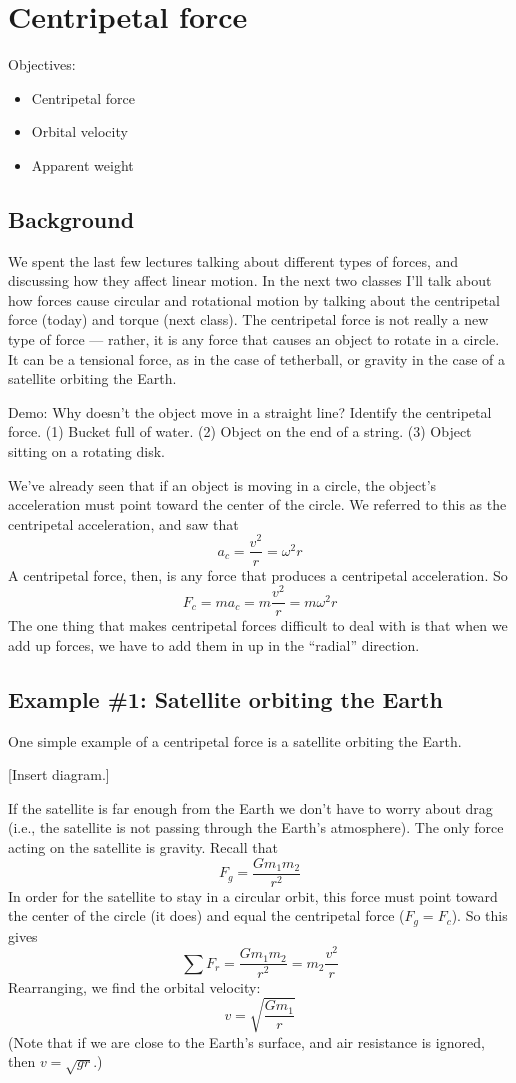 \section{Centripetal force}
Objectives:
\begin{itemize}
\item Centripetal force
\item Orbital velocity
\item Apparent weight
\end{itemize}

\subsection{Background}
We spent the last few lectures talking about different types of forces, and discussing how they affect linear motion. In the next two classes I'll talk about how forces cause circular and rotational motion by talking about the centripetal force (today) and torque (next class). The centripetal force is not really a new type of force --- rather, it is any force that causes an object to rotate in a circle. It can be a tensional force, as in the case of tetherball, or gravity in the case of a satellite orbiting the Earth.

Demo: Why doesn't the object move in a straight line? Identify the centripetal force. (1) Bucket full of water. (2) Object on the end of a string. (3) Object sitting on a rotating disk.

We've already seen that if an object is moving in a circle, the object's acceleration must point toward the center of the circle. We referred to this as the centripetal acceleration, and saw that
$$a_c=\frac{v^2}{r}=\omega^2r$$
A centripetal force, then, is any force that produces a centripetal acceleration. So
$$F_c=ma_c=m\frac{v^2}{r}=m\omega^2r$$
The one thing that makes centripetal forces difficult to deal with is that when we add up forces, we have to add them in up in the ``radial'' direction.

\subsection{Example \#1: Satellite orbiting the Earth}
One simple example of a centripetal force is a satellite orbiting the Earth.

[Insert diagram.]
\vspace{5cm}

If the satellite is far enough from the Earth we don't have to worry about drag (i.e., the satellite is not passing through the Earth's atmosphere). The only force acting on the satellite is gravity. Recall that
$$F_g=\frac{Gm_1m_2}{r^2}$$
In order for the satellite to stay in a circular orbit, this force must point toward the center of the circle (it does) and equal the centripetal force ($F_g=F_c$). So this gives
$$\sum F_r = \frac{Gm_1m_2}{r^2}=m_2\frac{v^2}{r}$$
Rearranging, we find the orbital velocity:
$$\boxed{v=\sqrt{\frac{Gm_1}{r}}}$$
(Note that if we are close to the Earth's surface, and air resistance is ignored, then $v=\sqrt{gr}$.)

